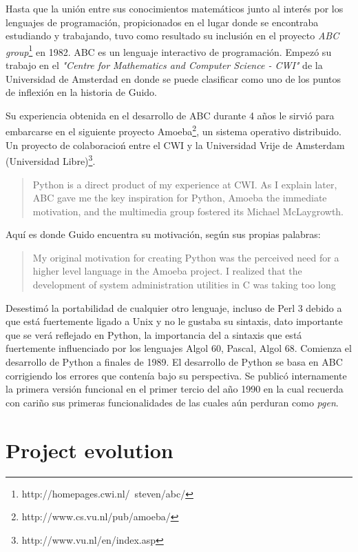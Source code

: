 \documentclass[11pt]{scrartcl}
\begin{document}
Hasta que la unión entre sus conocimientos matemáticos junto al interés por los lenguajes de programación, propicionados en el lugar donde se encontraba estudiando y trabajando, tuvo como resultado su inclusión en el proyecto \emph{ABC group}\footnote{http://homepages.cwi.nl/~steven/abc/} en 1982. ABC es un lenguaje interactivo de programación. Empezó su trabajo en el \emph{"Centre for Mathematics and Computer Science - CWI"} de la Universidad de Amsterdad en donde se puede clasificar como uno de los puntos de inflexión en la historia de Guido.

Su experiencia obtenida en el desarrollo de ABC durante 4 años le sirvió para embarcarse en el siguiente proyecto Amoeba\footnote{http://www.cs.vu.nl/pub/amoeba/}, un sistema operativo distribuido. Un proyecto de colaboracioń entre el CWI y la Universidad Vrije de Amsterdam (Universidad Libre)\footnote{http://www.vu.nl/en/index.asp}.

\begin{quotation}
    Python is a direct product of my experience at CWI. As I explain later, ABC gave me the key inspiration for Python, Amoeba the immediate motivation, and the multimedia group fostered its Michael McLaygrowth.
\end{quotation}

Aquí es donde Guido encuentra su motivación, según sus propias palabras:
\begin{quotation}
My original motivation for creating Python was the perceived need for a higher level language in the Amoeba project. I realized that the development of system administration utilities in C was taking too long
\end{quotation}

Desestimó la portabilidad de cualquier otro lenguaje, incluso de Perl 3 debido a que está fuertemente ligado a Unix y no le gustaba su sintaxis, dato importante que se verá reflejado en Python, la importancia del a sintaxis que está fuertemente influenciado por los lenguajes Algol 60, Pascal, Algol 68.
Comienza el desarrollo de Python a finales de 1989. El desarrollo de Python se basa en ABC corrigiendo los errores que contenía bajo su perspectiva. Se publicó internamente la primera versión funcional en el primer tercio del año 1990 en la cual recuerda con cariño sus primeras funcionalidades de las cuales aún perduran como \emph{pgen}.

\section{Project evolution}
\end{document}
